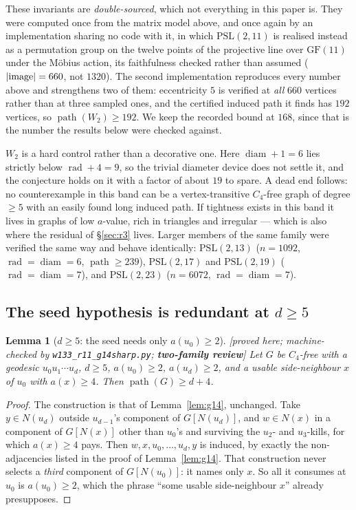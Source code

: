 \documentclass[11pt]{article}
\theoremstyle{plain}
\newtheorem{lemma}[theorem]{Lemma}
\theoremstyle{definition}
\theoremstyle{remark}
\numberwithin{equation}{section}
\newcommand{\rad}{\operatorname{rad}}
\newcommand{\diam}{\operatorname{diam}}
\newcommand{\pth}{\operatorname{path}}
\newcommand{\statusbox}[1]{{\small\sloppy\textsf{[#1]}}}
\newcommand{\REV}[1]{\statusbox{proved here; machine-checked by \texttt{#1};
\textbf{two-family review}}}
\begin{document}
These invariants are \emph{double-sourced}, which not everything in this paper is. They were
computed once from the matrix model above, and once again by an implementation sharing no
code with it, in which $\mathrm{PSL}(2,11)$ is realised instead as a permutation group on the
twelve points of the projective line over $\mathrm{GF}(11)$ under the M\"obius action, its
faithfulness checked rather than assumed ($|{\rm image}| = 660$, not $1320$). The second
implementation reproduces every number above and strengthens two of them: eccentricity $5$ is
verified at \emph{all} $660$ vertices rather than at three sampled ones, and the certified
induced path it finds has $192$ vertices, so $\pth(W_2)\ge 192$. We keep the recorded bound at
$168$, since that is the number the results below were checked against.

$W_2$ is a hard control rather than a decorative one. Here $\diam + 1 = 6$ lies strictly below
$\rad + 4 = 9$, so the trivial diameter device does not settle it, and the conjecture holds on
it with a factor of about $19$ to spare. A dead end follows: no counterexample in this band
can be a vertex-transitive $C_4$-free graph of degree $\ge 5$ with an easily found long
induced path. If tightness exists in this band it lives in graphs of low $a$-value, rich in
triangles and irregular --- which is also where the residual of \S\ref{sec:r3} lives. Larger
members of the same family were verified the same way and behave identically:
$\mathrm{PSL}(2,13)$ ($n = 1092$, $\rad = \diam = 6$, $\pth \ge 239$), $\mathrm{PSL}(2,17)$
and $\mathrm{PSL}(2,19)$ ($\rad = \diam = 7$), and $\mathrm{PSL}(2,23)$ ($n = 6072$,
$\rad = \diam = 7$).

\subsection{The seed hypothesis is redundant at $d \ge 5$}

\begin{lemma}[$d\ge 5$: the seed needs only $a(u_0)\ge 2$]\label{lem:g41}
\REV{w133\_r11\_g14sharp.py}
Let $G$ be $C_4$-free with a geodesic $u_0u_1\cdots u_d$, $d \ge 5$, $a(u_0)\ge 2$,
$a(u_d)\ge 2$, and a usable side-neighbour $x$ of $u_0$ with $a(x)\ge 4$. Then
$\pth(G)\ge d+4$.
\end{lemma}

\begin{proof}
The construction is that of Lemma~\ref{lem:g14}, unchanged. Take $y \in N(u_d)$ outside
$u_{d-1}$'s component of $G[N(u_d)]$, and $w \in N(x)$ in a component of $G[N(x)]$ other than
$u_0$'s and surviving the $u_2$- and $u_3$-kills, for which $a(x)\ge 4$ pays. Then
$w, x, u_0, \dots, u_d, y$ is induced, by exactly the non-adjacencies listed in the proof of
Lemma~\ref{lem:g14}. That construction never selects a \emph{third} component of $G[N(u_0)]$:
it names only $x$. So all it consumes at $u_0$ is $a(u_0)\ge 2$, which the phrase ``some
usable side-neighbour $x$'' already presupposes.
\end{proof}
\end{document}
